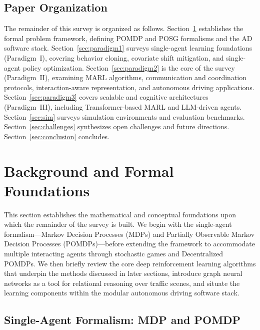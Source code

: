 \documentclass[12pt, a4paper]{article}
\begin{document}
\subsection{Paper Organization}
\label{sec:organization}

The remainder of this survey is organized as follows.
Section~\ref{sec:background} establishes the formal problem framework,
defining POMDP and POSG formalisms and the AD software stack.
Section~\ref{sec:paradigm1} surveys single-agent learning foundations
(Paradigm~I), covering behavior cloning, covariate shift mitigation,
and single-agent policy optimization.
Section~\ref{sec:paradigm2} is the core of the survey (Paradigm~II),
examining MARL algorithms, communication and coordination protocols,
interaction-aware representation, and autonomous driving applications.
Section~\ref{sec:paradigm3} covers scalable and cognitive architectures
(Paradigm~III), including Transformer-based MARL and LLM-driven agents.
Section~\ref{sec:sim} surveys simulation environments and
evaluation benchmarks.
Section~\ref{sec:challenges} synthesizes open challenges and future
directions.
Section~\ref{sec:conclusion} concludes.

\section{Background and Formal Foundations}
\label{sec:background}

This section establishes the mathematical and conceptual foundations upon which
the remainder of the survey is built.  We begin with the single-agent
formalism---Markov Decision Processes (MDPs) and Partially Observable Markov
Decision Processes (POMDPs)---before extending the framework to accommodate
multiple interacting agents through stochastic games and Decentralized POMDPs.
We then briefly review the core deep reinforcement learning algorithms that
underpin the methods discussed in later sections, introduce graph neural networks
as a tool for relational reasoning over traffic scenes, and situate the learning
components within the modular autonomous driving software stack.

\subsection{Single-Agent Formalism: MDP and POMDP}
\label{sec:mdp_pomdp}
\end{document}

